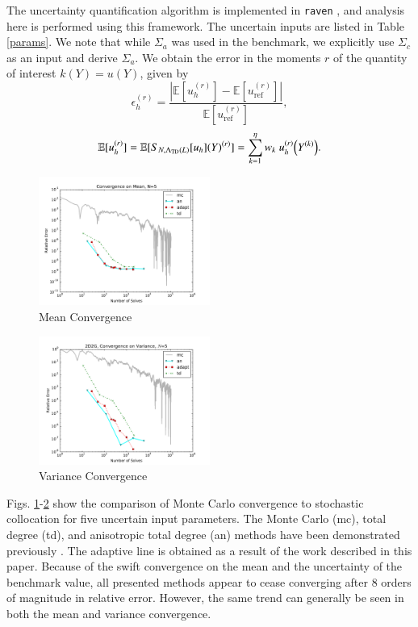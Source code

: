 \documentclass{anstrans} \usepackage{amsmath} \usepackage{amssymb}
\newcommand{\expv}[1]{\ensuremath{\mathbb{E}[ #1]}} \newcommand{\xs}[2]{\ensuremath{\Sigma_{#1}^{(#2)}}}
\begin{document}
The uncertainty quantification algorithm is implemented in \texttt{raven} \cite{raven}, and analysis here is performed
using this framework.  The uncertain inputs are listed in Table \ref{params}.  We note that while $\Sigma_a$
was used in the benchmark, we explicitly use $\Sigma_c$ as an input and derive $\Sigma_a$.
We obtain the error in the moments $r$ of the quantity of interest $k(Y)=u(Y)$, given by
\begin{equation}
  \epsilon_h^{(r)}=\frac{|\expv{u_h^{(r)}}-\expv{u_\text{ref}^{(r)}}|}{\expv{u_\text{ref}^{(r)}}},
\end{equation}
\begin{equation}
  \expv{u_h^{(r)}}=\expv{S_{N,\Lambda_\text{TD}(L)}[u_h](Y)^{(r)}}=\sum_{k=1}^\eta w_k
  ~u_h^{(r)}\qty(Y^{(k)}).
\end{equation}

\begin{figure}[H]
  \centering
  \includegraphics[width=0.5\textwidth]{../graphics/2D2G_meanconv_aniso_5}
  \caption{Mean Convergence}
  \label{mean}
\end{figure}
\begin{figure}[H]
  \centering
  \includegraphics[width=0.5\textwidth]{../graphics/2D2G_varconv_aniso_5}
  \caption{Variance Convergence}
  \label{variance}
\end{figure}
Figs. \ref{mean}-\ref{variance} show the comparison of Monte Carlo convergence to stochastic collocation for
five uncertain input parameters.  The Monte Carlo (mc), total degree (td), and anisotropic total degree (an)
methods have been demonstrated previously \cite{ans2014}.  The adaptive line is obtained as a result of the
work described in this paper.  Because of the swift convergence on the mean and the uncertainty of the
benchmark value, all presented methods appear to cease converging after 8 orders of magnitude in relative
error.  However, the same trend can generally be seen in both the mean and variance convergence.  
\end{document}
